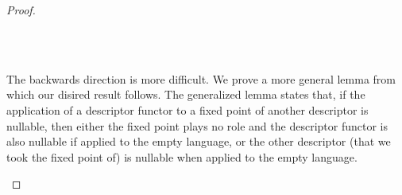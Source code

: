 \begin{proof}
\begin{code}[hide]
\AgdaInductiveConstructor{[]}\AgdaSpace{}%
\AgdaOperator{\AgdaInductiveConstructor{,}}\AgdaSpace{}%
\AgdaSpace{}%
\AgdaOperator{\AgdaInductiveConstructor{,}}\AgdaSpace{}%
\AgdaSpace{}%
\AgdaOperator{\AgdaInductiveConstructor{,}}\AgdaSpace{}%
\AgdaSymbol{)}\AgdaSpace{}%
\AgdaSymbol{=}\AgdaSpace{}%
\AgdaInductiveConstructor{[]}\AgdaSpace{}%
\AgdaOperator{\AgdaInductiveConstructor{,}}\AgdaSpace{}%
\AgdaInductiveConstructor{[]}\AgdaSpace{}%
\AgdaOperator{\AgdaInductiveConstructor{,}}\AgdaSpace{}%
\AgdaSpace{}%
\AgdaOperator{\AgdaInductiveConstructor{,}}\AgdaSpace{}%
\AgdaSpace{}%
\AgdaSpace{}%
\AgdaSpace{}%
\AgdaOperator{\AgdaInductiveConstructor{,}}\AgdaSpace{}%
\AgdaSpace{}%
\AgdaSpace{}%
\<%
\\
%
\>[4]\AgdaSpace{}%
\AgdaSymbol{(}\AgdaSpace{}%
\AgdaSpace{}%
\AgdaSymbol{)}\AgdaSpace{}%
\AgdaSymbol{(}\AgdaSpace{}%
\AgdaOperator{\AgdaInductiveConstructor{,}}\AgdaSpace{}%
\AgdaSymbol{)}\AgdaSpace{}%
\AgdaSymbol{=}\AgdaSpace{}%
\AgdaSpace{}%
\AgdaOperator{\AgdaInductiveConstructor{,}}\AgdaSpace{}%
\AgdaSpace{}%
\AgdaSpace{}%
\<%
\\
%
\>[4]\AgdaSpace{}%
\AgdaSymbol{(}\AgdaSpace{}%
\AgdaSymbol{)}\AgdaSpace{}%
\AgdaSpace{}%
\AgdaSymbol{=}\AgdaSpace{}%
\<%
\end{code}
The backwards direction is more difficult. We prove a more general lemma from which our disired result follows. The generalized lemma states that, if the application of a descriptor functor to a fixed point of another descriptor is nullable, then either the fixed point plays no role and the descriptor functor is also nullable if applied to the empty language, or the other descriptor (that we took the fixed point of) is nullable when applied to the empty language.
\begin{code}%
%
\>[4]\AgdaSpace{}%
\AgdaSymbol{:}\AgdaSpace{}%
\AgdaSpace{}%
\AgdaSpace{}%
\AgdaSpace{}%
\AgdaSpace{}%
\AgdaSymbol{(}\AgdaSpace{}%
\AgdaSpace{}%
\AgdaSpace{}%
\AgdaSpace{}%

\end{code}
\end{proof}
